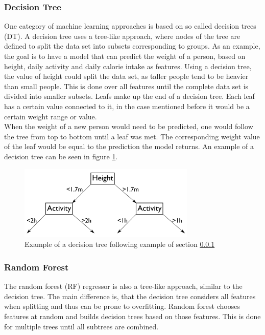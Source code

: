 \subsubsection{Decision Tree}
\label{sec:dt}
One category of machine learning approaches is based on so called decision trees (DT). A decision tree uses a tree-like approach, where nodes of the tree are defined to split the data set into subsets corresponding to groups. As an example, the goal is to have a model that can predict the weight of a person, based on height, daily activity and daily calorie intake as features. Using a decision tree, the value of height could split the data set, as taller people tend to be heavier than small people. This is done over all features until the complete data set is divided into smaller subsets. Leafs make up the end of a decision tree. Each leaf has a certain value connected to it, in the case mentioned before it would be a certain weight range or value. \\
When the weight of a new person would need to be predicted, one would follow the tree from top to bottom until a leaf was met. The corresponding weight value of the leaf would be equal to the prediction the model returns. An example of a decision tree can be seen in figure \ref{fig:dtdiag}.

\begin{figure}[h]
\centering
\includegraphics[width=0.75\textwidth]{figures/dtdiag}
\caption[Diagram of decision tree]{Example of a decision tree following example of section \ref{sec:dt}}
\label{fig:dtdiag}
\end{figure}

\newpage

\subsubsection{Random Forest}
The random forest (RF) regressor is also a tree-like approach, similar to the decision tree. The main difference is, that the decision tree considers all features when splitting and thus can be prone to overfitting. Random forest chooses features at random and builds decision trees based on those features. This is done for multiple trees until all subtrees are combined.

